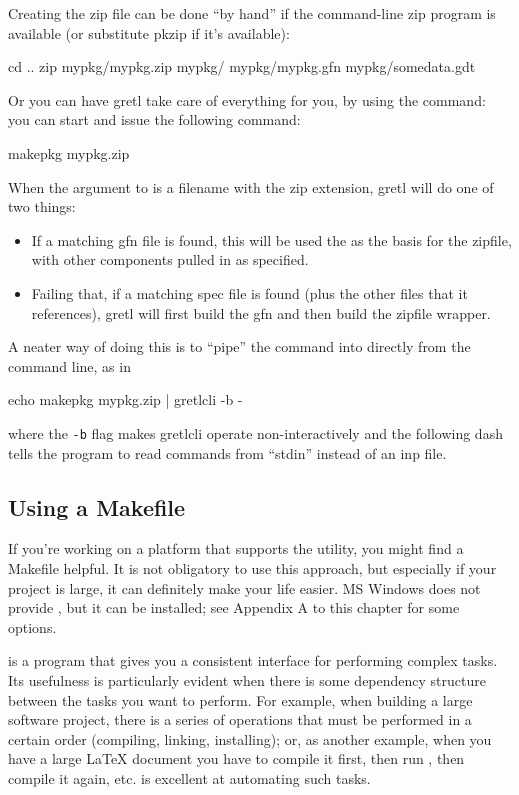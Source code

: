 \documentclass[oneside]{book}
\begin{document}
Creating the zip file can be done ``by hand'' if the command-line
\textsf{zip} program is available (or substitute \textsf{pkzip} if
it's available):
\begin{code}
cd ..
zip mypkg/mypkg.zip mypkg/ mypkg/mypkg.gfn mypkg/somedata.gdt
\end{code}

Or you can have gretl take care of everything for you, by using the
 command: you can start  and issue the
following command:
%
\begin{code}
makepkg mypkg.zip
\end{code}
%
When the argument to  is a filename with the \textsf{zip}
extension, gretl will do one of two things:
\begin{itemize}
\item If a matching \textsf{gfn} file is found, this will be used the
  as the basis for the zipfile, with other components pulled in as
  specified.
\item Failing that, if a matching \textsf{spec} file is found (plus
  the other files that it references), gretl will first build the
  \textsf{gfn} and then build the zipfile wrapper.
\end{itemize}

A neater way of doing this is to ``pipe'' the  command
into  directly from the command line, as in
\begin{code}
echo makepkg mypkg.zip | gretlcli -b -
\end{code}
%
where the \texttt{-b} flag makes \textsf{gretlcli} operate
non-interactively and the following dash tells the program to read
commands from ``stdin'' instead of an \textsf{inp} file.

\subsection{Using a Makefile}
\label{sec:using-make}

If you're working on a platform that supports the  utility,
you might find a Makefile helpful. It is not obligatory to use this
approach, but especially if your project is large, it can definitely
make your life easier. MS Windows does not provide , but it
can be installed; see Appendix A to this chapter for some options.

 is a program that gives you a consistent interface for
performing complex tasks. Its usefulness is particularly evident when
there is some dependency structure between the tasks you want to
perform. For example, when building a large software project, there is
a series of operations that must be performed in a certain order
(compiling, linking, installing); or, as another example, when you
have a large \LaTeX{} document you have to compile it first, then run
\BibTeX{}, then compile it again, etc.  is excellent at
automating such tasks.
\end{document}
